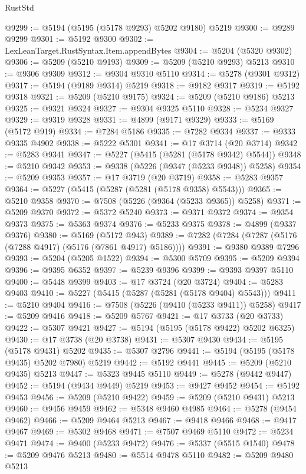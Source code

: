 \begin{lexlean}{RustStd}
\begin{coremodule}
@9299 := @5194 (@5195 (@5178 @9293) @5202 @9180) @5219
@9300 := @9289 @9299
@9301 := @5192 @9300
@9302 := LexLeanTarget.RustSyntax.Item.appendBytes
@9304 := @5204 (@5320 @9302)
@9306 := @5209 (@5210 @9193)
@9309 := @5209 (@5210 @9293) @5213
@9310 := @9306 @9309
@9312 := @9304 @9310 @5110
@9314 := @5278 (@9301 @9312)
@9317 := @5194 (@9189 @9314) @5219
@9318 := @9182 @9317
@9319 := @5192 @9318
@9321 := @5209 (@5210 @9175)
@9324 := @5209 (@5210 @9186) @5213
@9325 := @9321 @9324
@9327 := @9304 @9325 @5110
@9328 := @5234 @9327
@9329 := @9319 @9328
@9331 := @4899 (@9171 @9329)
@9333 := @5169 (@5172 @919)
@9334 := @7284 @5186
@9335 := @7282 @9334
@9337 := @9333 @9335 @4902
@9338 := @5222 @5301
@9341 := @17 @3714 (@20 @3714)
@9342 := @5283 @9341
@9347 := @5227 (@5415 (@5281 (@5178 @9342) @5544))
@9348 := @5210 @9342
@9353 := @9338 (@5226 (@9347 (@5233 @9348)) @5258)
@9354 := @5209 @9353
@9357 := @17 @3719 (@20 @3719)
@9358 := @5283 @9357
@9364 := @5227 (@5415 (@5287 (@5281 (@5178 @9358) @5543)))
@9365 := @5210 @9358
@9370 := @7508 (@5226 (@9364 (@5233 @9365)) @5258)
@9371 := @5209 @9370
@9372 := @5372 @5240
@9373 := @9371 @9372
@9374 := @9354 @9373
@9375 := @5363 @9374
@9376 := @5233 @9375
@9378 := @4899 (@9337 @9376)
@9380 := @5169 (@5172 @943)
@9389 := @7282 (@7284 (@7287 (@5176 (@7288 @4917) (@5176 (@7861 @4917) @5186))))
@9391 := @9380 @9389 @7296
@9393 := @5204 (@5205 @1522)
@9394 := @5300 @5709
@9395 := @5209 @9394
@9396 := @9395 @6352
@9397 := @5239 @9396
@9399 := @9393 @9397 @5110
@9400 := @5448 @9399
@9403 := @17 @3724 (@20 @3724)
@9404 := @5283 @9403
@9410 := @5227 (@5415 (@5287 (@5281 (@5178 @9404) @5543)))
@9411 := @5210 @9404
@9416 := @7508 (@5226 (@9410 (@5233 @9411)) @5258)
@9417 := @5209 @9416
@9418 := @5209 @5767
@9421 := @17 @3733 (@20 @3733)
@9422 := @5307 @9421
@9427 := @5194 (@5195 (@5178 @9422) @5202 @6325)
@9430 := @17 @3738 (@20 @3738)
@9431 := @5307 @9430
@9434 := @5195 (@5178 @9431) @5202
@9435 := @5307 @2796
@9441 := @5194 (@5195 (@5178 @9435) @5202 @7980) @5219
@9442 := @5192 @9441
@9445 := @5209 (@5210 @9435) @5213
@9447 := @5323 @9445 @5110
@9449 := @5278 (@9442 @9447)
@9452 := @5194 (@9434 @9449) @5219
@9453 := @9427 @9452
@9454 := @5192 @9453
@9456 := @5209 (@5210 @9422)
@9459 := @5209 (@5210 @9431) @5213
@9460 := @9456 @9459
@9462 := @5348 @9460 @4985
@9464 := @5278 (@9454 @9462)
@9466 := @5209 @9464 @5213
@9467 := @9418 @9466
@9468 := @9417 @9467
@9469 := @5302 @9468
@9471 := @7507 @9469 @5110
@9472 := @5234 @9471
@9474 := @9400 (@5233 @9472)
@9476 := @5337 (@5515 @1540)
@9478 := @5209 @9476 @5213
@9480 := @5514 @9478 @5110
@9482 := @5209 @9480 @5213

\end{coremodule}
\end{lexlean}
